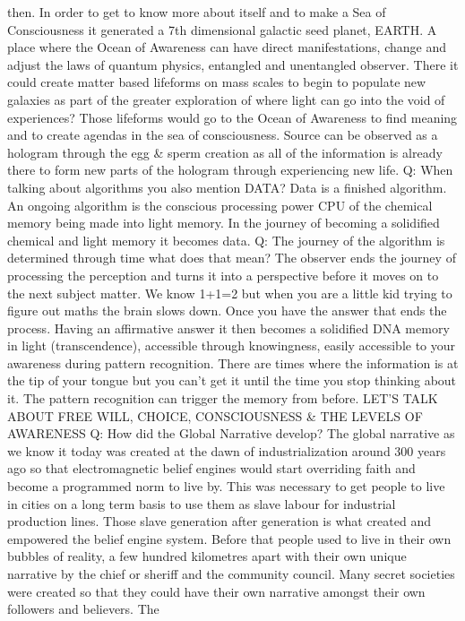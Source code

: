 then. In order to get to know more about itself and to make a Sea of
Consciousness it generated a 7th dimensional galactic seed planet,
EARTH. A place where the Ocean of Awareness can have direct
manifestations, change and adjust the laws of quantum physics, entangled
and unentangled observer. There it could create matter based lifeforms
on mass scales to begin to populate new galaxies as part of the greater
exploration of where light can go into the void of experiences? Those
lifeforms would go to the Ocean of Awareness to find meaning and to
create agendas in the sea of consciousness. Source can be observed as a
hologram through the egg \& sperm creation as all of the information is
already there to form new parts of the hologram through experiencing new
life. Q: When talking about algorithms you also mention DATA? Data is a
finished algorithm. An ongoing algorithm is the conscious processing
power CPU of the chemical memory being made into light memory. In the
journey of becoming a solidified chemical and light memory it becomes
data. Q: The journey of the algorithm is determined through time what
does that mean? The observer ends the journey of processing the
perception and turns it into a perspective before it moves on to the
next subject matter. We know 1+1=2 but when you are a little kid trying
to figure out maths the brain slows down. Once you have the answer that
ends the process. Having an affirmative answer it then becomes a
solidified DNA memory in light (transcendence), accessible through
knowingness, easily accessible to your awareness during pattern
recognition. There are times where the information is at the tip of your
tongue but you can't get it until the time you stop thinking about it.
The pattern recognition can trigger the memory from before. LET'S TALK
ABOUT FREE WILL, CHOICE, CONSCIOUSNESS \& THE LEVELS OF AWARENESS Q: How
did the Global Narrative develop? The global narrative as we know it
today was created at the dawn of industrialization around 300 years ago
so that electromagnetic belief engines would start overriding faith and
become a programmed norm to live by. This was necessary to get people to
live in cities on a long term basis to use them as slave labour for
industrial production lines. Those slave generation after generation is
what created and empowered the belief engine system. Before that people
used to live in their own bubbles of reality, a few hundred kilometres
apart with their own unique narrative by the chief or sheriff and the
community council. Many secret societies were created so that they could
have their own narrative amongst their own followers and believers. The
